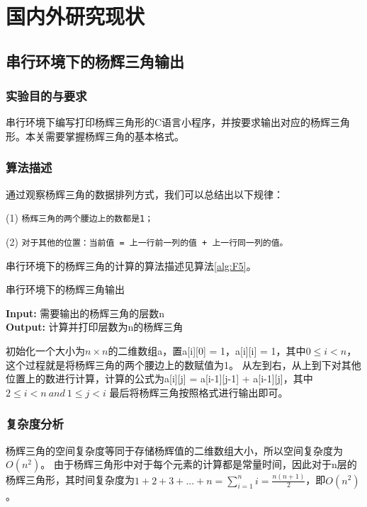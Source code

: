 \documentclass[supercite]{Experimental_Report}
\theoremstyle{definition}
\begin{document}
\newpage
\section{国内外研究现状}
\subsection{串行环境下的杨辉三角输出}
\subsubsection{实验目的与要求}
串行环境下编写打印杨辉三角形的C语言小程序，并按要求输出对应的杨辉三角形。本关需要掌握杨辉三角的基本格式。

\subsubsection{算法描述}
通过观察杨辉三角的数据排列方式，我们可以总结出以下规律：

(1) \texttt{杨辉三角的两个腰边上的数都是1；}

(2) \texttt{对于其他的位置：当前值 = 上一行前一列的值 + 上一行同一列的值。}

串行环境下的杨辉三角的计算的算法描述见算法\ref{alg:F5}。

\begin{algorithm}[htb]
\caption{串行环境下的杨辉三角输出}
\label{alg:F5}
\hspace*{0.02in} {\bf Input:}
需要输出的杨辉三角的层数n\\
\hspace*{0.02in} {\bf Output:} 
计算并打印层数为n的杨辉三角
  \begin{algorithmic}[1]
    \State
        初始化一个大小为$n\times n$的二维数组a，置a[i][0] = 1，a[i][i] = 1，其中$0\le i < n$，这个过程就是将杨辉三角的两个腰边上的数赋值为1。
    \State
        从左到右，从上到下对其他位置上的数进行计算，计算的公式为a[i][j] = a[i-1][j-1] + a[i-1][j]，其中$2 \le i < n\ and\ 1 \le j < i$
    \State
        最后将杨辉三角按照格式进行输出即可。
  \end{algorithmic}
\end{algorithm}

\subsubsection{复杂度分析}
杨辉三角的空间复杂度等同于存储杨辉值的二维数组大小，所以空间复杂度为$O(n^2)$。
由于杨辉三角形中对于每个元素的计算都是常量时间，因此对于n层的杨辉三角形，其时间复杂度为$1+2+3+...+n=\sum_{i=1}^{n}i = \frac{n(n+1)}{2}$，即$O(n^2)$。
\end{document}
